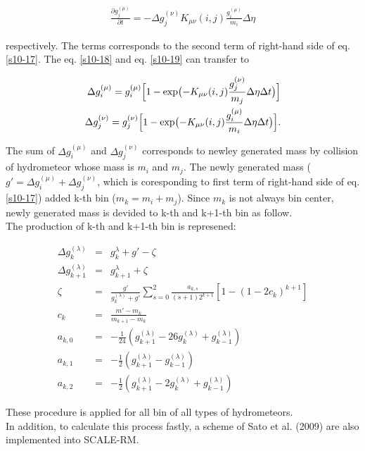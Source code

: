 \begin{eqnarray}
\frac{\partial g_{j}^{(\mu)}}{\partial t}=-\Delta g^{(\nu)}_{j}K_{\mu\nu}(i,j)\frac{g_{i}^{(\mu)}}{m_{i}}\Delta \eta\label{s10-19}
\end{eqnarray}

respectively. The terms corresponds to the second term of right-hand side of eq.\ref{s10-17}. The eq. \ref{s10-18} and eq. \ref{s10-19} can transfer to

\begin{eqnarray}
\Delta g_{i}^{(\mu)}=g_{i}^{(\mu)}\Bigl [1-\exp\bigl(-K_{\mu\nu}(i,j)\frac{g^{(\nu)}_{j}}{m_{j}}\Delta \eta\Delta t\bigr) \Bigl]\label{s10-20}\\
\Delta g_{j}^{(\nu)}=g_{j}^{(\nu)}\Bigl [1-\exp\bigl(-K_{\mu\nu}(i,j)\frac{g^{(\mu)}_{i}}{m_{i}}\Delta \eta\Delta t\bigr) \Bigl].\label{s10-21}
\end{eqnarray}

The sum of $\Delta g_{i}^{(\mu)}$ and $\Delta g_{j}^{(\nu)}$ corresponds to newley generated mass by collision of hydrometeor whose mass is $m_{i}$ and $m_{j}$. The newly generated mass ($g'=\Delta g_{i}^{(\mu)}+\Delta g_{j}^{(\nu)}$, which is coresponding to first term of right-hand side of eq.\ref{s10-17}) added k-th bin ($m_{k}=m_{i}+m_{j}$). Since $m_{k}$ is not always bin center, newly generated mass is devided to k-th and k+1-th bin as follow.\\
The production of k-th and k+1-th bin is represened:

\begin{eqnarray}
\Delta g_{k}^{(\lambda)}&=&g_{k}^{\lambda}+g'-\zeta\label{s10-22}\\
\Delta g_{k+1}^{(\lambda)}&=&g_{k+1}^{\lambda}+\zeta\label{s10-23}\\
\zeta&=&\frac{g'}{g_{k}^{(\lambda)}+g'}\sum_{s=0}^{2}\frac{a_{k,s}}{(s+1)2^{k+1}}[1-(1-2c_{k})^{k+1}]\nonumber\\
c_{k}&=&\frac{m'-m_{k}}{m_{k+1}-m_{k}}\nonumber\\
a_{k,0}&=&-\frac{1}{24}(g_{k+1}^{(\lambda)}-26g_{k}^{(\lambda)}+g_{k-1}^{(\lambda)})\nonumber\\
a_{k,1}&=&-\frac{1}{2}(g_{k+1}^{(\lambda)}-g_{k-1}^{(\lambda)})\nonumber\\
a_{k,2}&=&-\frac{1}{2}(g_{k+1}^{(\lambda)}-2g_{k}^{(\lambda)}+g_{k-1}^{(\lambda)})\nonumber
\end{eqnarray}

These procedure is applied for all bin of all types of hydrometeors.\\
In addition, to calculate this process fastly, a scheme of Sato et al. (2009)\cite{sato_etal_2009} are also implemented into SCALE-RM.

